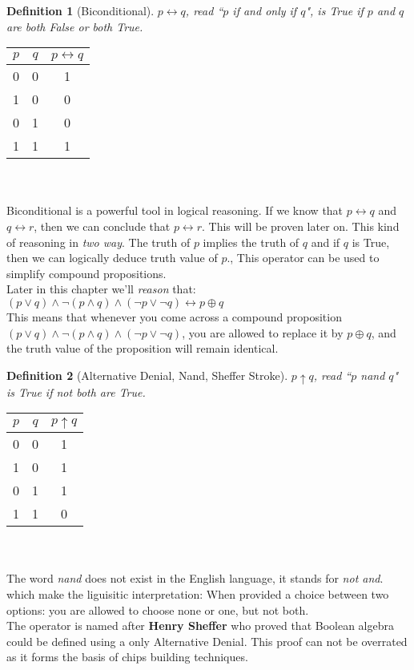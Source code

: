 \documentclass[10pt,a4paper,draft,titlepage,onecolumn]{book}
\newtheorem{definition}{Definition}[subsection]
\begin{document}
\begin{definition}[Biconditional] $p{\leftrightarrow}q$, read ``$p$ if and only if  $q$", is True if $p$ and $q$ are both False or both True.
\end{definition}
\begin{tabular}{ |c|c|c| }
 \hline
 $p$ & $q$ &   $p{\leftrightarrow}q$\\
 \hline
 0 & 0 & 1 \\
 1 & 0 & 0\\
 0 & 1 & 0\\
 1 & 1 & 1\\
 \hline
\end{tabular}\\\\
Biconditional is a powerful tool in logical reasoning. If we know that $p{\leftrightarrow}q$ and $q{\leftrightarrow}r$, then we can conclude that $p{\leftrightarrow}r$. This will be proven later on. This kind of reasoning in \textit{two way}. The truth of $p$ implies the truth of $q$ and if $q$ is True, then we can logically deduce truth value of $p$., This operator can be used to simplify compound propositions. \\
Later in this chapter we'll \textit{reason} that:
$(p{\vee}q)\wedge{\neg}(p{\wedge}q)\wedge({\neg}p{\vee}{\neg}q) \leftrightarrow p \oplus q$\\
This means that whenever you come across a compound proposition $(p{\vee}q)\wedge{\neg}(p{\wedge}q)\wedge({\neg}p{\vee}{\neg}q)$, you are allowed to replace it by $p \oplus q$, and the truth value of the proposition will remain identical.


\begin{definition}[Alternative Denial, Nand, Sheffer Stroke] $p{\uparrow}q$, read  ``$p$ \textit{nand} $q$"  is True if not both are True.
\end{definition}
\begin{tabular}{ |c|c|c| }
 \hline
 $p$ & $q$ &  $p{\uparrow}q$  \\
 \hline
 0 & 0 & 1 \\
 1 & 0 & 1\\
 0 & 1 & 1\\
 1 & 1 & 0\\
 \hline
\end{tabular}  \\\\
The word \textit{nand} does not exist in the English language, it stands for \textit{not and}. which make the liguisitic interpretation: When provided a choice between two options: you are allowed to choose none or one, but not both.\\
The operator is named after \textbf{Henry Sheffer} who proved that Boolean algebra could be defined using a only Alternative Denial. This proof can not be overrated as it forms the basis of chips building techniques.
\end{document}
